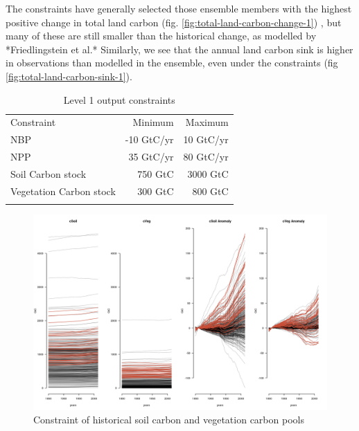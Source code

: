 \documentclass[gmd, manuscript]{copernicus}
\begin{document}
The constraints have generally selected those ensemble members with the highest positive change in total land carbon (fig. \ref{fig:total-land-carbon-change-1}) , but many of these are still smaller than the historical change, as modelled by *Friedlingstein et al.* Similarly, we see that the annual land carbon sink is higher in observations than modelled in the ensemble, even under the constraints (fig \ref{fig:total-land-carbon-sink-1}).


\begin{table}[t]
\caption{Level 1 output constraints}
\label{table:level_1_constraints}
\begin{tabular}{l r r}
\tophline
Constraint & Minimum & Maximum \\ 
\middlehline
NBP & -10 GtC/yr &  10 GtC/yr\\
NPP & 35 GtC/yr & 80 GtC/yr \\
Soil Carbon stock & 750 GtC &  3000 GtC\\ 
Vegetation Carbon stock & 300 GtC & 800 GtC \\

\bottomhline
\end{tabular}
\belowtable{} %

\end{table}




%
\begin{figure}[t]
\includegraphics[width=12cm]{./graphics/vegC-soilC-constrained-1}
\caption{Constraint of historical soil carbon and vegetation carbon pools}
\label{fig:vegC-soilC-constrained-1}
\end{figure}
\end{document}
